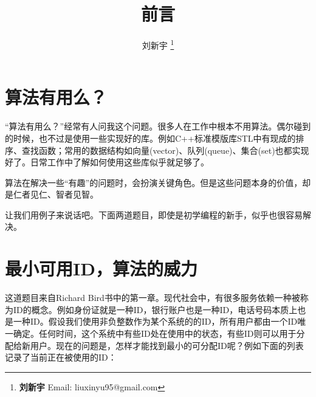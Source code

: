 \documentclass{article}
\begin{document}


\title{前言}

\author{刘新宇
\thanks{{\bfseries 刘新宇} \newline
  Email: liuxinyu95@gmail.com \newline}
  }

\maketitle
\fi


\section{算法有用么？}
\label{why}

“算法有用么？”经常有人问我这个问题。很多人在工作中根本不用算法。偶尔碰到的时候，也不过是使用一些实现好的库。例如C++标准模版库STL中有现成的排序、查找函数；常用的数据结构如向量(vector)、队列(queue)、集合(set)也都实现好了。日常工作中了解如何使用这些库似乎就足够了。

算法在解决一些“有趣”的问题时，会扮演关键角色。但是这些问题本身的价值，却是仁者见仁、智者见智。

让我们用例子来说话吧。下面两道题目，即使是初学编程的新手，似乎也很容易解决。

\section{最小可用ID，算法的威力}
\label{min-free} 

这道题目来自Richard Bird书中的第一章\cite{fp-pearls}。现代社会中，有很多服务依赖一种被称为ID的概念。例如身份证就是一种ID，银行账户也是一种ID，电话号码本质上也是一种ID。假设我们使用非负整数作为某个系统的的ID，所有用户都由一个ID唯一确定。任何时间，这个系统中有些ID处在使用中的状态，有些ID则可以用于分配给新用户。现在的问题是，怎样才能找到最小的可分配ID呢？例如下面的列表记录了当前正在被使用的ID：
\end{document}
